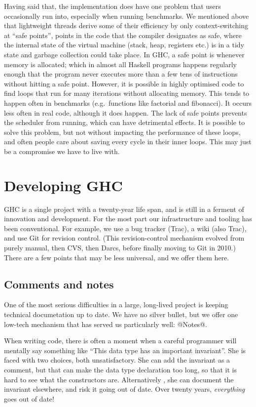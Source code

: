 \documentclass{article}
\begin{document}
{Having said that, the implementation does have one problem that users
occasionally run into, especially when running benchmarks.  We
mentioned above that lightweight threads derive some of their
efficiency by only context-switching at ``safe points'', points in the
code that the compiler designates as safe, where the internal state of
the virtual machine (stack, heap, registers etc.) is in a tidy state
and garbage collection could take place.  In GHC, a safe point is
whenever memory is allocated; which in almost all Haskell programs
happens regularly enough that the program never executes more than a
few tens of instructions without hitting a safe point.  However, it is
possible in highly optimised code to find loops that run for many
iterations without allocating memory.  This tends to happen often in
benchmarks (e.g.\ functions like factorial and fibonacci).  It occurs
less often in real code, although it does happen.  The lack of safe
points prevents the scheduler from running, which can have detrimental
effects.  It is possible to solve this problem, but not without
impacting the performance of these loops, and often people care about
saving every cycle in their inner loops.  This may just be a
compromise we have to live with.

\section{Developing GHC}

GHC is a single project with a twenty-year life span, and is still in
a ferment of innovation and development.  For the most part our 
infrastructure and tooling has been conventional.  For example, we use
a bug tracker (Trac), a wiki (also Trac), and use Git for revision
control. (This revision-control mechanism evolved from purely manual,
then CVS, then Darcs, before finally moving to Git in 2010.)  There 
are a few points that may be less universal, and we offer them here.

\subsection{Comments and notes}

One of the most serious difficulties in a large, long-lived project is 
keeping technical documetation up to date.  We have no silver bullet,
but we offer one low-tech mechanism that has served us particularly well: @Notes@.

When writing code, there is often a moment when a careful programmer
will mentally say something like ``This data type has an important
invariant''.  She is faced with two choices, both unsatisfactory.  She
can add the invariant as a comment, but that can make the data type
declaration too long, so that it is hard to see what the constructors
are.  Alternatively , she can document the invariant elsewhere, and
risk it going out of date.  Over twenty years, \emph{everything} goes out of
date!

}
\end{document}
